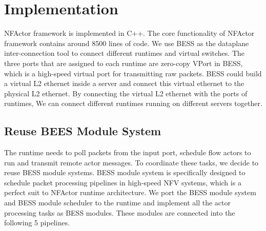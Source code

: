 \section{Implementation}
\label{sec:implementation}



NFActor framework is implemented in C++. The core functionality of NFActor framework contains around 8500 lines of code. We use BESS \cite{bess}\cite{2015} as the dataplane inter-connection tool to connect different runtimes and virtual switches. The three ports that are assigned to each runtime are zero-copy VPort in BESS, which is a high-speed virtual port for transmitting raw packets. BESS could build a virtual L2 ethernet inside a server and connect this virtual ethernet to the physical L2 ethernet. By connecting the virtual L2 ethernet with the ports of runtimes, We can connect different runtimes running on different servers together.

\subsection {Reuse BEES Module System}

The runtime needs to poll packets from the input port, schedule flow actors to run and transmit remote actor messages. To coordinate these tasks, we decide to reuse BESS module systems. BESS module system is specifically designed to schedule packet processing pipelines in high-speed NFV systems, which is a perfect suit to NFActor runtime architecture. We port the BESS module system and BESS module scheduler to the runtime and implement all the actor processing tasks as BESS modules. These modules are connected into the following 5 pipelines.

